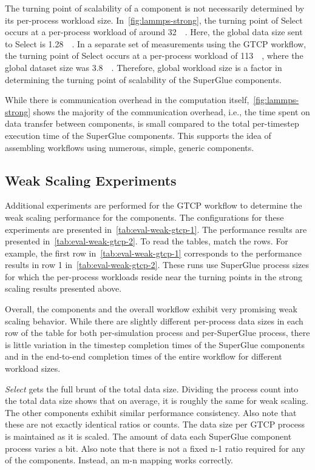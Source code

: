 The turning point of scalability of a component
is not necessarily determined by
its per-process workload size.
In~\autoref{fig:lammps-strong}, the turning point of Select
occurs at a per-process workload of around \SI{32}{\mega\byte}.
Here, the global data size sent to Select
is \SI{1.28}{\giga\byte}.
In a separate set of measurements using the GTCP workflow,
the turning point of Select occurs at a per-process workload
of \SI{113}{\mega\byte}, where the global dataset size
was \SI{3.8}{\giga\byte}. Therefore, global workload size
is a factor in determining the turning point of scalability
of the SuperGlue components.

While there is communication overhead in the computation itself,~\autoref{fig:lammps-strong} shows the majority of the communication
overhead, i.e., the time spent on data transfer between components,
is small compared to the total per-timestep execution time of
the SuperGlue components. This supports the idea
of assembling workflows using numerous, simple,
generic components.

\subsection{Weak Scaling Experiments}

Additional experiments are performed for the GTCP workflow to determine the
weak scaling performance for the components. The configurations for these experiments
are presented in~\autoref{tab:eval-weak-gtcp-1}. The performance results are
presented in~\autoref{tab:eval-weak-gtcp-2}. To read the tables, match the
rows. For example, the first row in~\autoref{tab:eval-weak-gtcp-1} corresponds
to the performance results in row 1 in~\autoref{tab:eval-weak-gtcp-2}.
These runs use SuperGlue process sizes for which the per-process
workloads reside near the turning points in the
strong scaling results presented above.

Overall, the components and the overall workflow
exhibit very promising weak scaling behavior.
While there are slightly different per-process
data sizes in each row of the table for both
per-simulation process and per-SuperGlue process,
there is little variation in the timestep completion
times of the SuperGlue components and in the end-to-end
completion times of the entire workflow for different
workload sizes.

{\em Select} gets the full brunt of the total data size. Dividing the process
count into the total data size shows that on average, it is roughly the same
for weak scaling. The other components exhibit similar performance consistency.
Also note that these are not exactly identical ratios or counts.  The data size
per GTCP process is maintained as it is scaled. The amount of data each
SuperGlue component process varies a bit. Also note that there is not a fixed
n-1 ratio required for any of the components. Instead, an m-n mapping works
correctly.

